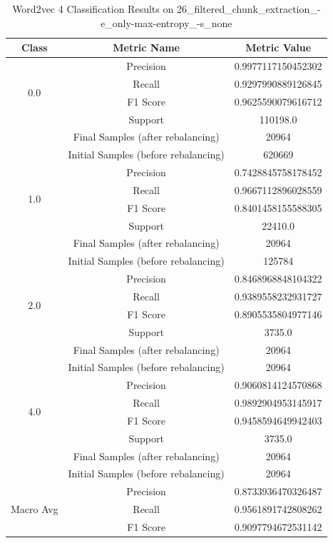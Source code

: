 \begin{longtable}{|c|c|c|}
\caption{Word2vec 4 Classification Results on 26\_filtered\_chunk\_extraction\_-e\_only-max-entropy\_-s\_none} \label{tab:26_filtered_chunk_extraction_-e_only-max-entropy_-s_none_word2vec_4_classifiers_results} \\
\hline
Class & Metric Name & Metric Value \\
\hline
\multirow{4}{*}{0.0} & Precision & 0.9977117150452302 \\
 & Recall & 0.9297990889126845 \\
 & F1 Score & 0.9625590079616712 \\
 & Support & 110198.0 \\
 & Final Samples (after rebalancing) & 20964 \\
 & Initial Samples (before rebalancing) & 620669 \\
\hline
\multirow{4}{*}{1.0} & Precision & 0.7428845758178452 \\
 & Recall & 0.9667112896028559 \\
 & F1 Score & 0.8401458155588305 \\
 & Support & 22410.0 \\
 & Final Samples (after rebalancing) & 20964 \\
 & Initial Samples (before rebalancing) & 125784 \\
\hline
\multirow{4}{*}{2.0} & Precision & 0.8468968848104322 \\
 & Recall & 0.9389558232931727 \\
 & F1 Score & 0.8905535804977146 \\
 & Support & 3735.0 \\
 & Final Samples (after rebalancing) & 20964 \\
 & Initial Samples (before rebalancing) & 20964 \\
\hline
\multirow{4}{*}{4.0} & Precision & 0.9060814124570868 \\
 & Recall & 0.9892904953145917 \\
 & F1 Score & 0.9458594649942403 \\
 & Support & 3735.0 \\
 & Final Samples (after rebalancing) & 20964 \\
 & Initial Samples (before rebalancing) & 20964 \\
\hline
\multirow{4}{*}{Macro Avg} & Precision & 0.8733936470326487 \\
 & Recall & 0.9561891742808262 \\
 & F1 Score & 0.9097794672531142 \\

\end{longtable}
